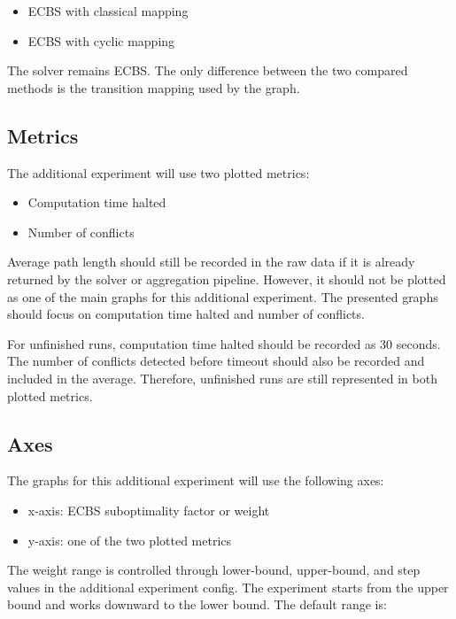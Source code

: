 \documentclass[11pt,a4paper]{article}
\begin{document}
\begin{itemize}[leftmargin=2em]
    \item ECBS with classical mapping
    \item ECBS with cyclic mapping
\end{itemize}

The solver remains ECBS. The only difference between the two compared methods is the transition mapping used by the graph.

\subsection*{Metrics}

The additional experiment will use two plotted metrics:

\begin{itemize}[leftmargin=2em]
    \item Computation time halted
    \item Number of conflicts
\end{itemize}

Average path length should still be recorded in the raw data if it is already returned by the solver or aggregation pipeline. However, it should not be plotted as one of the main graphs for this additional experiment. The presented graphs should focus on computation time halted and number of conflicts.

For unfinished runs, computation time halted should be recorded as 30 seconds. The number of conflicts detected before timeout should also be recorded and included in the average. Therefore, unfinished runs are still represented in both plotted metrics.

\subsection*{Axes}

The graphs for this additional experiment will use the following axes:

\begin{itemize}[leftmargin=2em]
    \item x-axis: ECBS suboptimality factor or weight
    \item y-axis: one of the two plotted metrics
\end{itemize}

The weight range is controlled through lower-bound, upper-bound, and step values in the additional experiment config. The experiment starts from the upper bound and works downward to the lower bound. The default range is:
\end{document}
